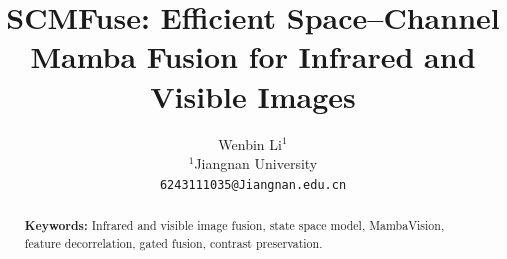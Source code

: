 \documentclass[10pt,twocolumn,letterpaper]{article}
\title{\vspace{-1.0cm}\Large\bfseries SCMFuse: Efficient Space--Channel Mamba Fusion for Infrared and Visible Images}
\author{
    \normalsize Wenbin Li$^{1}$ \\[0.3em]
    \small $^{1}$Jiangnan University \\
    {\tt\footnotesize 6243111035@Jiangnan.edu.cn}
}
\date{\vspace{-1.5em}}
\begin{document}
\maketitle

\begin{abstract}
\noindent\small


\vspace{0.4em}
\noindent\textbf{Keywords:} Infrared and visible image fusion, state space model, MambaVision, feature decorrelation, gated fusion, contrast preservation.
\end{abstract}
\vspace{0.5em}







{\small


}
\end{document}
